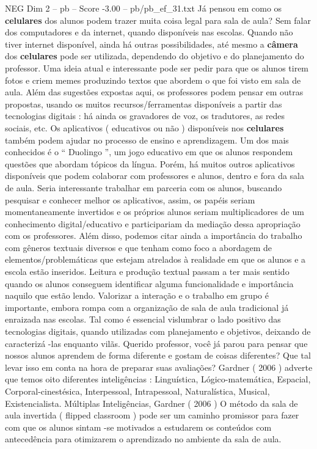 \begin{textsample}{NEG Dim 2 – pb – Score -3.00 – pb/pb\_ef\_31.txt}
Já pensou em como os \textbf{celulares} dos alunos podem trazer muita coisa legal para sala de aula?
Sem falar dos computadores e da internet, quando disponíveis nas escolas.
Quando não tiver internet disponível, ainda há outras possibilidades, até mesmo a \textbf{câmera} dos \textbf{celulares} pode ser utilizada, dependendo do objetivo e do planejamento do professor.
Uma ideia atual e interessante pode ser pedir para que os alunos tirem fotos e criem memes produzindo textos que abordem o que foi visto em sala de aula.
Além das sugestões expostas aqui, os professores podem pensar em outras propostas, usando os muitos recursos/ferramentas disponíveis a partir das tecnologias digitais : há ainda os gravadores de voz, os tradutores, as redes sociais, etc.
Os aplicativos ( educativos ou não ) disponíveis nos \textbf{celulares} também podem ajudar no processo de ensino e aprendizagem.
Um dos mais conhecidos é o “ Duolingo ”, um jogo educativo em que os alunos respondem questões que abordam tópicos da língua.
Porém, há muitos outros aplicativos disponíveis que podem colaborar com professores e alunos, dentro e fora da sala de aula.
Seria interessante trabalhar em parceria com os alunos, buscando pesquisar e conhecer melhor os aplicativos, assim, os papéis seriam momentaneamente invertidos e os próprios alunos seriam multiplicadores de um conhecimento digital/educativo e participariam da mediação dessa apropriação com os professores.
Além disso, podemos citar ainda a importância do trabalho com gêneros textuais diversos e que tenham como foco a abordagem de elementos/problemáticas que estejam atrelados à realidade em que os alunos e a escola estão inseridos.
Leitura e produção textual passam a ter mais sentido quando os alunos conseguem identificar alguma funcionalidade e importância naquilo que estão lendo.
Valorizar a interação e o trabalho em grupo é importante, embora rompa com a organização de sala de aula tradicional já enraizada nas escolas.
Tal como é essencial vislumbrar o lado positivo das tecnologias digitais, quando utilizadas com planejamento e objetivos, deixando de caracterizá -las enquanto vilãs.
Querido professor, você já parou para pensar que nossos alunos aprendem de forma diferente e gostam de coisas diferentes?
Que tal levar isso em conta na hora de preparar suas avaliações?
Gardner ( 2006 ) adverte que temos oito diferentes inteligências : Linguística, Lógico-matemática, Espacial, Corporal-cinestésica, Interpessoal, Intrapessoal, Naturalística, Musical, Existencialista.
Múltiplas Inteligências, Gardner ( 2006 ) O método da sala de aula invertida ( flipped classroom ) pode ser um caminho promissor para fazer com que os alunos sintam -se motivados a estudarem os conteúdos com antecedência para otimizarem o aprendizado no ambiente da sala de aula.

\end{textsample}
